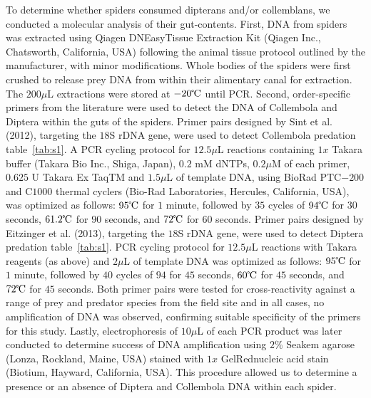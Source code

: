 To determine whether spiders consumed dipterans and/or collemblans, we conducted a molecular analysis of their gut-contents.  First, DNA from spiders was extracted using Qiagen DNEasy\circledR Tissue Extraction Kit {\color{red}(Qiagen Inc., Chatsworth, California, USA)} following the animal tissue protocol outlined by the manufacturer, with minor modifications.  Whole bodies of the spiders were first crushed to release prey DNA from within their alimentary canal for extraction.  The $200 \mu$L extractions were stored at $-20\celsius$ until PCR.  Second, order-specific primers from the literature were used to detect the DNA of Collembola and Diptera within the guts of the spiders.  Primer pairs designed by {\color{red} Sint et al. (2012)}, targeting the $18$S rDNA gene, were used to detect Collembola predation table~\ref{tab:s1}.  A PCR cycling protocol for $12.5 \mu$L reactions containing $1x$ Takara buffer {\color{red}(Takara Bio Inc., Shiga, Japan)}, $0.2$ mM dNTPs, $0.2 \mu$M of each primer, $0.625$ U Takara Ex TaqTM and $1.5 \mu$L of template DNA, using BioRad PTC$-200$ and C$1000$ thermal cyclers {\color{red}(Bio-Rad Laboratories, Hercules, California, USA)}, was optimized as follows: $95\celsius$ for $1$ minute, followed by $35$ cycles of $94\celsius$ for $30$ seconds, $61.2\celsius$ for $90$ seconds, and $72\celsius$ for $60$ seconds.  Primer pairs designed by {\color{red}Eitzinger et al. (2013)}, targeting the $18$S rDNA gene, were used to detect Diptera predation table~\ref{tab:s1}.  PCR cycling protocol for $12.5 \mu$L reactions with Takara reagents (as above) and $2 \mu$L of template DNA was optimized as follows: $95\celsius$ for $1$ minute, followed by $40$ cycles of $94$ for $45$ seconds, $60\celsius$ for $45$ seconds, and $72\celsius$ for $45$ seconds.  Both primer pairs were tested for cross-reactivity against a range of prey and predator species from the field site and in all cases, no amplification of DNA was observed, confirming suitable specificity of the primers for this study.  Lastly, electrophoresis of $10 \mu$L of each PCR product was later conducted to determine success of DNA amplification using $2\%$ Seakem agarose {\color{red}(Lonza, Rockland, Maine, USA)} stained with $1x$ GelRed\texttrademark nucleic acid stain {\color{red}(Biotium, Hayward, California, USA)}.  This procedure allowed us to determine a presence or an absence of Diptera and Collembola DNA within each spider. 

